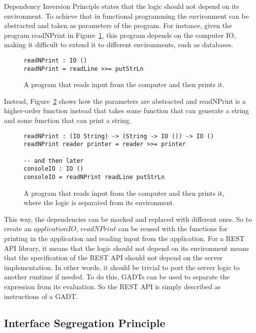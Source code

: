 Dependency Inversion Principle states that the logic should not depend on its
environment. To achieve that in functional programming the environment can
be abstracted and taken as parameters of the program. For instance, given the
program readNPrint in Figure~\ref{diexample}, this program depends on the
computer IO, making it difficult to extend it to different environments, such as
databases. 

\begin{figure}[H]
    \begin{lstlisting}
readNPrint : IO () 
readNPrint = readLine >>= putStrLn
    \end{lstlisting}
    \caption{A program that reads input from the computer and then prints it.}
    \label{diexample}
\end{figure}

Instead, Figure~\ref{withdiexample} shows how the parameters are abstracted and
readNPrint is a higher-order function instead that takes some function that
can generate a string and some function that can print a string.


\begin{figure}[H]
    \begin{lstlisting}
readNPrint : (IO String) -> (String -> IO ()) -> IO ()
readNPrint reader printer = reader >>= printer

-- and then later
consoleIO : IO ()
consoleIO = readNPrint readLine putStrLn
    \end{lstlisting}
    \caption{A program that reads input from the computer and then prints it,
    where the logic is separated from its environment.}
    \label{withdiexample}
\end{figure}

This way, the dependencies can be mocked and replaced with different ones. So 
 to create an $applicationIO$,  $readNPrint$ can be reused with the
functions for printing in the application and reading input from the
application.  For a REST API library, it means that the logic should not depend
on its environment means that the specification of the REST API should not
depend on the server implementation. In other words, it should be trivial to
port the server logic to another runtime if needed. To do this, GADTs can be
used to separate the expression from its evaluation. So the REST API is simply
described as instructions of a GADT. 

\subsection{Interface Segregation Principle} 

